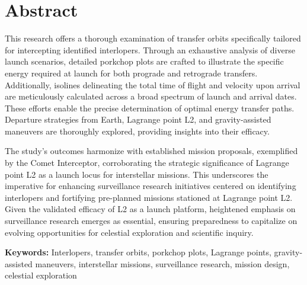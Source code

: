 \chapter*{Abstract}

This research offers a thorough examination of transfer orbits specifically
tailored for intercepting identified interlopers. Through an exhaustive analysis
of diverse launch scenarios, detailed porkchop plots are crafted to illustrate
the specific energy required at launch for both prograde and retrograde
transfers. Additionally, isolines delineating the total time of flight and
velocity upon arrival are meticulously calculated across a broad spectrum of
launch and arrival dates. These efforts enable the precise determination of
optimal energy transfer paths. Departure strategies from Earth, Lagrange point
L2, and gravity-assisted maneuvers are thoroughly explored, providing insights
into their efficacy.

The study's outcomes harmonize with established mission proposals, exemplified
by the Comet Interceptor, corroborating the strategic significance of Lagrange
point L2 as a launch locus for interstellar missions. This underscores the
imperative for enhancing surveillance research initiatives centered on
identifying interlopers and fortifying pre-planned missions stationed at
Lagrange point L2. Given the validated efficacy of L2 as a launch platform,
heightened emphasis on surveillance research emerges as essential, ensuring
preparedness to capitalize on evolving opportunities for celestial exploration
and scientific inquiry.


\vspace{4cm}
\textbf{Keywords:} Interlopers, transfer orbits, porkchop plots, Lagrange points,
gravity-assisted maneuvers, interstellar missions, surveillance research,
mission design, celestial exploration
